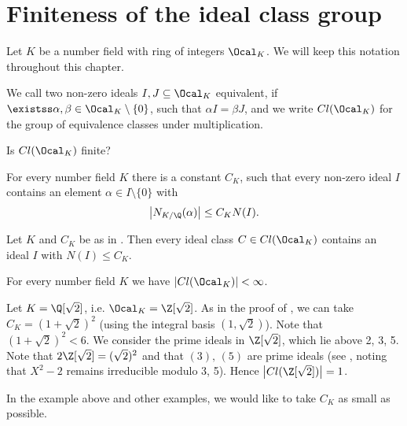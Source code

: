 \section{Finiteness of the ideal class group}

Let \( K \) be a number field with ring of integers \( \Ocal_K \).
We will keep this notation throughout this chapter.

\begin{rec*}
	We call two non-zero ideals \( I,J \subseteq \Ocal_K \) equivalent, if \( \existss \alpha,\beta \in \Ocal_K \setminus \{0\} \), such that \( \alpha I = \beta J \), and we write \( Cl(\Ocal_K) \) for the group of equivalence classes under multiplication.
\end{rec*}

\begin{frage*}
	Is \( Cl(\Ocal_K) \) finite?
\end{frage*}

\begin{thmn}\label{thm:3.1}
	For every number field \( K \) there is a constant \( C_K \), such that every non-zero ideal \( I \) contains an element \( \alpha \in I \setminus \{0\} \) with
	\[ \big| N_{K/\Q} (\alpha) \big| \leq C_K N(I). \]
\end{thmn}

\begin{cor}\label{thm:3.2}
	Let \( K \) and \( C_K \) be as in .
	Then every ideal class \( C \in Cl(\Ocal_K) \) contains an ideal \( I \) with \( N(I) \leq C_K \).
\end{cor}

\begin{cor}\label{thm:3.3}
	For every number field \( K \) we have \( |Cl(\Ocal_K)| < \infty \).
\end{cor}

\begin{exmp*}
	Let \( K = \Q[\sqrt{2}] \), i.e. \( \Ocal_K = \Z[\sqrt{2}] \).
	As in the proof of , we can take \( C_K = (1 + \sqrt{2})^2 \) (using the integral basis \( (1, \sqrt{2}) \)).
	Note that \( (1 + \sqrt{2})^2 < 6 \).
	We consider the prime ideals in \( \Z[\sqrt{2}] \), which lie above 2, 3, 5.
	Note that \( 2 \Z[\sqrt{2}] = (\sqrt{2})^2 \) and that \( (3),\, (5) \) are prime ideals (see , noting that \( X^2-2 \) remains irreducible modulo 3, 5).
	Hence \( \big| Cl(\Z[\sqrt{2}]) \big| = 1 \).
\end{exmp*}

\begin{rem*}
	In the example above and other examples, we would like to take \( C_K \) as small as possible.
\end{rem*}

